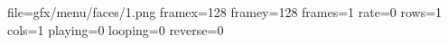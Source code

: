 file=gfx/menu/faces/1.png
framex=128
framey=128
frames=1
rate=0
rows=1
cols=1
playing=0
looping=0
reverse=0